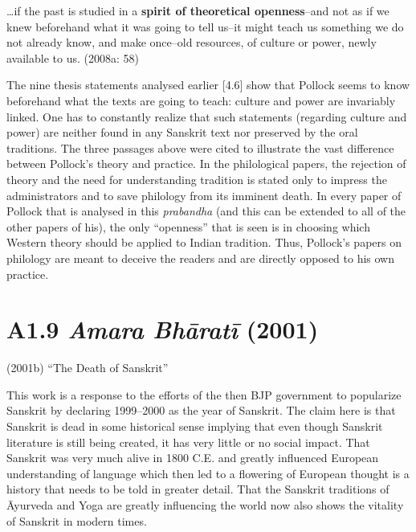 {{\begin{myquote}
…if the past is studied in a \textbf{spirit of theoretical openness}–and not as if we knew beforehand what it was going to tell us–it might teach us something we do not already know, and make once–old resources, of culture or power, newly available to us. (2008a: 58)
\end{myquote}

The nine thesis statements analysed earlier [4.6] show that Pollock seems to know beforehand what the texts are going to teach: culture and power are invariably linked. One has to constantly realize that such statements (regarding culture and power) are neither found in any Sanskrit text nor preserved by the oral traditions. The three passages above were cited to illustrate the vast difference between Pollock’s theory and practice. In the philological papers, the rejection of theory and the need for understanding tradition is stated only to impress the administrators and to save philology from its imminent death. In every paper of Pollock that is analysed in this \textit{prabandha }(and this can be extended to all of the other papers of his), the only “openness” that is seen is in choosing which Western theory should be applied to Indian tradition. Thus, Pollock’s papers on philology are meant to deceive the readers and are directly opposed to his own practice.

\vspace{-.3cm}

\section*{A1.9 \textit{Amara Bhāratī} (2001)}

(2001b) “The Death of Sanskrit”

This work is a response to the efforts of the then BJP government to popularize Sanskrit by declaring 1999–2000 as the year of Sanskrit. The claim here is that Sanskrit is dead in some historical sense implying that even though Sanskrit literature is still being created, it has very little or no social impact. That Sanskrit was very much alive in 1800 C.E. and greatly influenced European understanding of language which then led to a flowering of European thought is a history that needs to be told in greater detail. That the Sanskrit traditions of Āyurveda and Yoga are greatly influencing the world now also shows the vitality of Sanskrit in modern times.

}}
